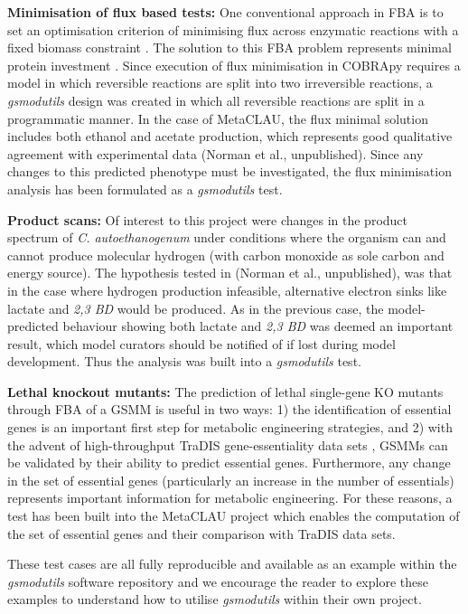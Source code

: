\documentclass[journal=asbcd6]{achemso}
\begin{document}
\textbf{Minimisation of flux based tests:}
One conventional approach in FBA is to set an optimisation criterion of minimising flux across enzymatic reactions with a fixed biomass constraint \cite{holzhutter2006thegeneralised}. 
The solution to this FBA problem represents minimal protein investment \cite{holzhutter2006thegeneralised}.
Since execution of flux minimisation in COBRApy requires a model in which reversible reactions are split into two irreversible reactions, a \textit{gsmodutils} design was created in which all reversible reactions are split in a programmatic manner.
In the case of MetaCLAU, the flux minimal solution includes both ethanol and acetate production, which represents good qualitative agreement with experimental data (Norman et al., unpublished).
Since any changes to this predicted phenotype must be investigated, the flux minimisation analysis has been formulated as a \textit{gsmodutils} test.

\textbf{Product scans:}
Of interest to this project were changes in the product spectrum of \textit{C. autoethanogenum} under conditions where the organism can and cannot produce molecular hydrogen (with carbon monoxide as sole carbon and energy source).
The hypothesis tested in (Norman et al., unpublished), was that in the case where hydrogen production infeasible, alternative electron sinks like lactate and \textit{2,3 BD} would be produced.
As in the previous case, the model-predicted behaviour showing both lactate and \textit{2,3 BD} was deemed an important result, which model curators should be notified of if lost during model development.
Thus the analysis was built into a \textit{gsmodutils} test.

\textbf{Lethal knockout mutants:} 
The prediction of lethal single-gene KO mutants through FBA of a GSMM is useful in two ways: 
1) the identification of essential genes is an important first step for metabolic engineering strategies, 
and 2) with the advent of high-throughput TraDIS gene-essentiality data sets \cite{langridge2009simultaneous}, GSMMs can be validated by their ability to predict essential genes.
Furthermore, any change in the set of essential genes (particularly an increase in the number of essentials) represents important information for metabolic engineering.
For these reasons, a test has been built into the MetaCLAU project which enables the computation of the set of essential genes and their comparison with TraDIS data sets.

These test cases are all fully reproducible and available as an example within the \textit{gsmodutils} software repository and we encourage the reader to explore these examples to understand how to utilise \textit{gsmodutils} within their own project.
\end{document}
